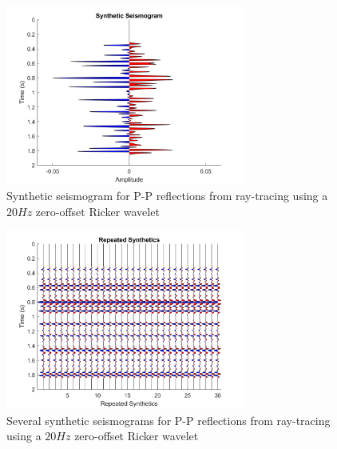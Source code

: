 \documentclass[12pt]{article}
\begin{document}
\begin{figure}[!htb]
	\centering
	\includegraphics[width=0.7\textwidth]{Figures/RTCsyntheticPPr.png}
	\caption[Fox Creek ray-tracing P-P synthetic seismogram using a Ricker wavelet]{Synthetic seismogram for P-P reflections from ray-tracing using a $20 Hz$ zero-offset Ricker wavelet}
	\label{fig:RTCsyntheticPPr}
\end{figure}	

\begin{figure}[!htb]
	\centering
	\includegraphics[width=0.7\textwidth]{Figures/RTCSeveralSyntheticsPPr.png}
	\caption[Fox Creek ray-tracing several P-P synthetic seismograms using a Ricker wavelet]{Several synthetic seismograms for P-P reflections from ray-tracing using a $20 Hz$ zero-offset Ricker wavelet}
	\label{fig:RTCSeveralSyntheticsPPr}
\end{figure}	

\FloatBarrier
\pagebreak
\end{document}

